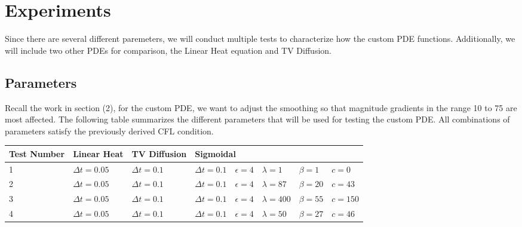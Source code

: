 \documentclass{article}
\begin{document}
  \newpage
  \section{Experiments}
  Since there are several different paremeters, we will conduct
  multiple tests to characterize how the custom PDE functions.
  Additionally, we will include two other PDEs for comparison,
  the Linear Heat equation and TV Diffusion.

  \subsection{Parameters}
  Recall the work in section (2), for the custom PDE, we want to adjust the
  smoothing so that magnitude gradients in the range 10 to 75 are most affected.
  The following table summarizes the different parameters that will be used for
  testing the custom PDE. All combinations of parameters satisfy the
  previously derived CFL condition.
  \begin{center}
    \begin{table}[h]
      \begin{tabular}{|l|l|ll|lllll|}
      \hline
      Test Number & Linear Heat & \multicolumn{2}{l|}{TV Diffusion} & \multicolumn{5}{l|}{Sigmoidal} \\ \hline
      1           &  $\Delta t = 0.05 $    & \multicolumn{1}{l|}{$\Delta t = 0.1$}  \ $\epsilon = 4$  &    & \multicolumn{1}{l|}{$\Delta t = 0.1$} & \multicolumn{1}{l|}{$\epsilon = 4$} & \multicolumn{1}{l|}{$\lambda = 1$}   & \multicolumn{1}{l|}{$\beta = 1$}  & $c= 0$  \\ \hline
      2           &  $\Delta t = 0.05 $    & \multicolumn{1}{l|}{$\Delta t = 0.1$}  \ $\epsilon = 4$  &    & \multicolumn{1}{l|}{$\Delta t = 0.1$} & \multicolumn{1}{l|}{$\epsilon = 4$} & \multicolumn{1}{l|}{$\lambda = 87$}  & \multicolumn{1}{l|}{$\beta = 20$} & $c= 43$ \\ \hline
      3           &  $\Delta t = 0.05 $    & \multicolumn{1}{l|}{$\Delta t = 0.1$}  \ $\epsilon = 4$  &    & \multicolumn{1}{l|}{$\Delta t = 0.1$} & \multicolumn{1}{l|}{$\epsilon = 4$} & \multicolumn{1}{l|}{$\lambda = 400$} & \multicolumn{1}{l|}{$\beta = 55$} & $c= 150$ \\ \hline
      4           &  $\Delta t = 0.05 $    & \multicolumn{1}{l|}{$\Delta t = 0.1$}  \ $\epsilon = 4$  &    & \multicolumn{1}{l|}{$\Delta t = 0.1$} & \multicolumn{1}{l|}{$\epsilon = 4$} & \multicolumn{1}{l|}{$\lambda = 50$}  & \multicolumn{1}{l|}{$\beta = 27$} & $c= 46$  \\ \hline
      \end{tabular}
    \end{table}
  \end{center}
\end{document}
